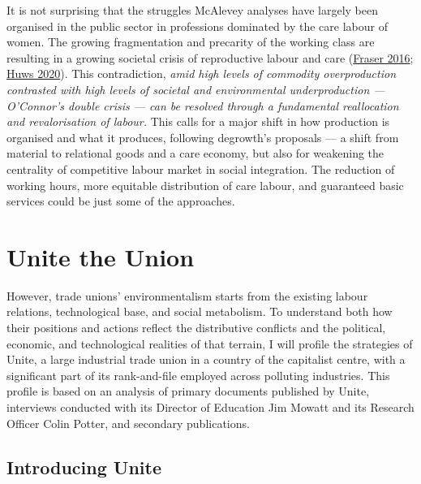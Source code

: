\documentclass[a4paper, nobind]{templates/ociamthesis}
\begin{document}
It is not surprising that the struggles McAlevey analyses have largely been organised in the public sector in professions dominated by the care labour of women. The growing fragmentation and precarity of the working class are resulting in a growing societal crisis of reproductive labour and care (\protect\hyperlink{ref-fraser_contradictions_2016}{Fraser 2016}; \protect\hyperlink{ref-huws_reinventing_2020}{Huws 2020}). This contradiction, \emph{amid high levels of commodity overproduction contrasted with high levels of societal and environmental underproduction --- O'Connor's double crisis --- can be resolved through a fundamental reallocation and revalorisation of labour.} This calls for a major shift in how production is organised and what it produces, following degrowth's proposals --- a shift from material to relational goods and a care economy, but also for weakening the centrality of competitive labour market in social integration. The reduction of working hours, more equitable distribution of care labour, and guaranteed basic services could be just some of the approaches.

\hypertarget{unite-the-union}{%
\section{Unite the Union}\label{unite-the-union}}

However, trade unions' environmentalism starts from the existing labour relations, technological base, and social metabolism. To understand both how their positions and actions reflect the distributive conflicts and the political, economic, and technological realities of that terrain, I will profile the strategies of Unite, a large industrial trade union in a country of the capitalist centre, with a significant part of its rank-and-file employed across polluting industries. This profile is based on an analysis of primary documents published by Unite, interviews conducted with its Director of Education Jim Mowatt and its Research Officer Colin Potter, and secondary publications.

\hypertarget{introducing-unite}{%
\subsection{Introducing Unite}\label{introducing-unite}}
\end{document}
